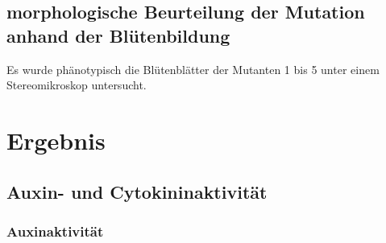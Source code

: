 \documentclass[10pt,a4paper]{article}
\begin{document}
	\subsection{morphologische Beurteilung der Mutation anhand der Blütenbildung}
	Es wurde phänotypisch die Blütenblätter der Mutanten 1 bis 5 unter einem Stereomikroskop untersucht.
	
	\section{Ergebnis}
	
	\subsection{Auxin- und Cytokininaktivität}
		\subsubsection{Auxinaktivität}
\end{document}
